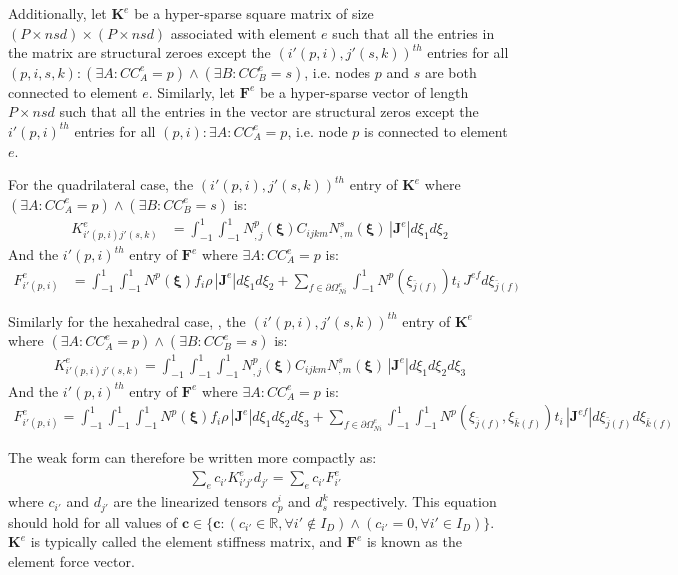 	Additionally, let $\bm{K}^e$ be a hyper-sparse square matrix of size $(P \times nsd) \times (P \times nsd)$ associated with element $e$ such that all the entries in the matrix are structural zeroes except the $(i'(p, i), j'(s, k))^{th}$ entries for all $(p, i, s, k) : (\exists A: CC^e_A = p) \wedge (\exists B: CC^e_B = s)$, i.e. nodes $p$ and $s$ are both connected to element $e$. Similarly, let $\bm{F}^e$ be a hyper-sparse vector of length $P \times nsd$ such that all the entries in the vector are structural zeros except the $i'(p, i)^{th}$ entries for all $(p, i) : \exists A : CC^e_A = p$, i.e. node $p$ is connected to element $e$.

	For the quadrilateral case, the $(i'(p, i), j'(s, k))^{th}$ entry of $\bm{K}^e$ where $(\exists A: CC^e_A = p) \wedge (\exists B: CC^e_B = s)$ is:
	\begin{align}
		K^e_{i'(p, i) j'(s, k)} & = \int_{-1}^1 \int_{-1}^1 N^p_{,j}(\bm{\xi})C_{ijkm}N^s_{,m}(\bm{\xi}) \,|\bm{J}^e|d\xi_1 d\xi_2
	\end{align}
	And the $i'(p, i)^{th}$ entry of $\bm{F}^e$ where $\exists A: CC^e_A = p$ is:
	\begin{align}
        F^e_{i'(p, i)} & = \int_{-1}^1 \int_{-1}^1 N^p(\bm{\xi})f_i \rho\,|\bm{J}^e|d\xi_1 d\xi_2 + \sum_{f \in \partial \Omega^e_{Ni}}\int_{-1}^1 N^p(\xi_{\bar{j}(f)})t_i \,J^{ef} d\xi_{\bar{j}(f)}
	\end{align}
	
	Similarly for the hexahedral case, , the $(i'(p, i), j'(s, k))^{th}$ entry of $\bm{K}^e$ where $(\exists A: CC^e_A = p) \wedge (\exists B: CC^e_B = s)$ is:
	\begin{align}
		K^e_{i'(p, i) j'(s, k)} = \int_{-1}^1 \int_{-1}^1 \int_{-1}^1 N^p_{,j}(\bm{\xi})C_{ijkm}N^s_{,m}(\bm{\xi}) \,|\bm{J}^e|d\xi_1 d\xi_2 d\xi_3
	\end{align}
	And the $i'(p, i)^{th}$ entry of $\bm{F}^e$ where $\exists A: CC^e_A = p$ is:
	\begin{align}
        F^e_{i'(p, i)} = \int_{-1}^1 \int_{-1}^1 \int_{-1}^1 N^p(\bm{\xi})f_i \rho\,|\bm{J}^e|d\xi_1 d\xi_2 d\xi_3 + \sum_{f \in \partial \Omega^e_{Ni}}\int_{-1}^1 \int_{-1}^1 N^p(\xi_{\bar{j}(f)}, \xi_{\bar{k}(f)})t_i \,|\bm{J}^{ef}| d\xi_{\bar{j}(f)} d\xi_{\bar{k}(f)}
	\end{align}

	The weak form can therefore be written more compactly as:
	\begin{align}
		& \sum_e c_{i'} K^e_{i'j'} d_{j'} = \sum_e c_{i'} F^e_{i'}
	\end{align}
	where $c_{i'}$ and $d_{j'}$ are the linearized tensors $c_p^i$ and $d_s^k$ respectively. This equation should hold for all values of $\bm{c} \in \{\bm{c} : (c_{i'} \in \mathbb{R}, \forall i' \notin I_D) \wedge (c_{i'} = 0, \forall i' \in I_D)\}$. $\bm{K}^e$ is typically called the element stiffness matrix, and $\bm{F}^e$ is known as the element force vector. 

